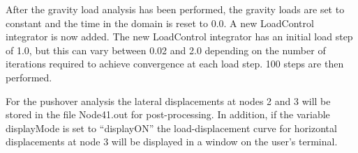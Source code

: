 \documentclass[12pt]{article}
\begin{document}
After the gravity load analysis has been performed, the gravity loads
are set to constant and the time in the domain is reset to 0.0. A new
LoadControl integrator is now added. The new LoadControl integrator
has an initial load step of 1.0, but this can vary between 0.02 and
2.0 depending on the number of iterations required to achieve
convergence at each load step. 100 steps are then performed.


\vspace{0.2in} 

For the pushover analysis the lateral displacements at nodes
2 and 3 will be stored in the file Node41.out for post-processing. In
addition, if the variable displayMode is set to ``displayON'' the
load-displacement curve for horizontal displacements at node 3 will 
be displayed in a window on the user's terminal.
\end{document}
